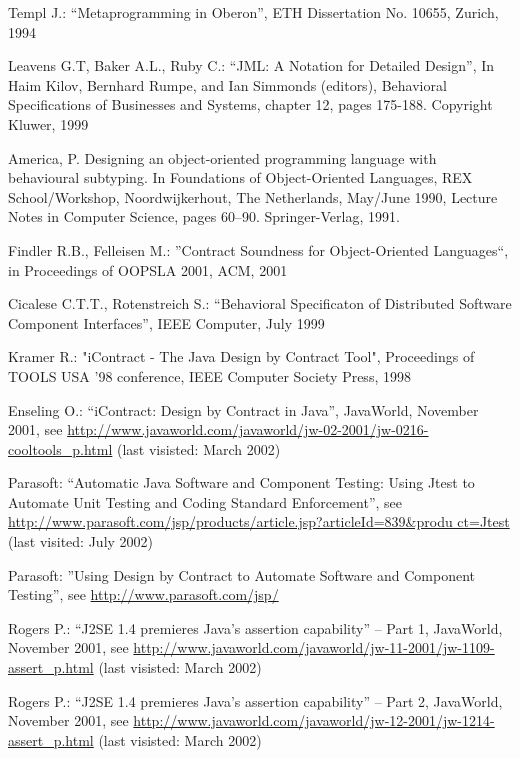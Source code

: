 \begin{thebibliography}{1}
{
Templ J.: “Metaprogramming in Oberon”, ETH Dissertation No.
10655, Zurich, 1994


 Leavens G.T, Baker A.L., Ruby C.: “JML: A Notation for
Detailed Design”, In Haim Kilov, Bernhard Rumpe, and Ian Simmonds
(editors), Behavioral Specifications of Businesses and Systems,
chapter 12, pages 175-188. Copyright Kluwer, 1999

America, P. Designing an object-oriented programming
language with behavioural subtyping. In Foundations of
Object-Oriented Languages, REX School/Workshop,
Noordwijkerhout, The Netherlands, May/June 1990, Lecture
Notes in Computer Science, pages 60–90. Springer-Verlag,
1991.

Findler R.B., Felleisen M.: ''Contract Soundness for Object-Oriented
Languages``, in Proceedings of OOPSLA 2001, ACM, 2001

Cicalese C.T.T., Rotenstreich S.: “Behavioral Specificaton of
Distributed Software Component Interfaces”, IEEE Computer, July
1999


Kramer R.: "iContract - The Java Design by Contract Tool",
Proceedings of TOOLS USA '98 conference, IEEE Computer Society
Press, 1998


 Enseling O.: “iContract: Design by Contract in
Java”, JavaWorld, November 2001, see
\url{http://www.javaworld.com/javaworld/jw-02-2001/jw-0216-cooltools_p.html}
(last visisted: March 2002)

Parasoft: “Automatic Java Software and Component Testing: Using
Jtest to Automate Unit Testing and Coding Standard Enforcement”,
see
\url{http://www.parasoft.com/jsp/products/article.jsp?articleId=839&produ
ct=Jtest} (last visited: July 2002)


Parasoft: ''Using Design by Contract to Automate Software and
Component Testing'', see
\url{http://www.parasoft.com/jsp/}

Rogers P.: “J2SE 1.4 premieres Java’s assertion capability”
– Part 1, JavaWorld, November 2001, see
\url{http://www.javaworld.com/javaworld/jw-11-2001/jw-1109-
assert_p.html} (last visisted: March 2002)

 Rogers P.: “J2SE 1.4 premieres Java’s assertion capability”
– Part 2, JavaWorld, November 2001,
see \url{http://www.javaworld.com/javaworld/jw-12-2001/jw-1214-
assert_p.html} (last visisted: March 2002)

}
\end{thebibliography}
